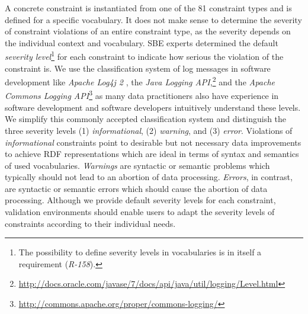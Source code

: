 \documentclass{llncs}
\newcommand{\ke}[1]{\todo[size=\small, color=orange!40]{\textbf{Kai:} #1}}
\begin{document}
A concrete constraint is instantiated from one of the 81 constraint types and is defined for a specific vocabulary.
It does not make sense to determine the severity of constraint violations of an entire constraint type,
as the severity depends on the individual context and vocabulary.
SBE experts determined the default \emph{severity level}\footnote{The possibility to define severity levels in vocabularies is in itself a requirement (\emph{R-158}).} for each constraint to indicate how serious the violation of the constraint is. We use the classification system of log messages in software development like \emph{Apache Log4j 2} \cite{Apache-2015}, the \emph{Java Logging API},\footnote{\url{http://docs.oracle.com/javase/7/docs/api/java/util/logging/Level.html}} and the \emph{Apache Commons Logging API}\footnote{\url{http://commons.apache.org/proper/commons-logging/}} as many data practitioners also have experience in software development and software developers intuitively understand these levels. We simplify this commonly accepted classification system and distinguish the three severity levels (1) \emph{informational}, (2) \emph{warning}, and (3) \emph{error}.
Violations of \emph{informational} constraints point to desirable but not necessary data improvements to achieve RDF representations which are ideal in terms of syntax and semantics of used vocabularies. 
\emph{Warnings} are syntactic or semantic problems which typically should not lead to an abortion of data processing.
\emph{Errors}, in contrast, are syntactic or semantic errors which should cause the abortion of data processing. 
Although we provide default severity levels for each constraint, validation environments should enable users to adapt the severity levels of constraints according to their individual needs.
\end{document}
